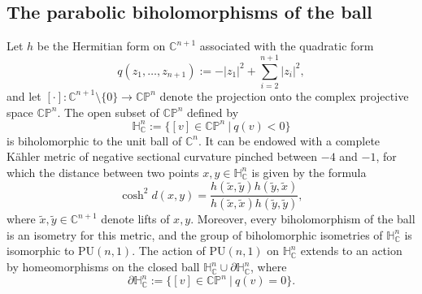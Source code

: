 \documentclass{article}
\theoremstyle{definition}
\theoremstyle{remark}
\newcommand{\C}{\mathbb{C}}
\newcommand{\HNC}{\mathbb{H}^{n}_{\C}}
\newcommand{\PHNC}{\partial\mathbb{H}^{n}_{\C}}
\newcommand{\PU}{\mathrm{PU}}
\newcommand{\PNC}{\C \mathbb{P}^{n}}
\begin{document}
	\subsection{The parabolic biholomorphisms of the ball}\label{ss-section-preli-parab}
	
	Let $h$ be the Hermitian form on $\C^{n+1}$ associated with the quadratic form\begin{equation*}
		q(z_1,\dots,z_{n+1}):=-\lvert z_1\rvert^{2} + \sum_{i=2}^{n+1}\lvert z_i\rvert^{2},
	\end{equation*}
	and let $[\cdot]:\C^{n+1}\setminus\{0\} \to \PNC$ denote the projection onto the complex projective space $\PNC$. The open subset of $\PNC$ defined by\begin{equation*}
		\HNC := \{[v]\in \PNC \ \vert \ q(v)<0\}
	\end{equation*}
	is biholomorphic to the unit ball of $\C^{n}$. It can be endowed with a complete Kähler metric of negative sectional curvature pinched between $-4$ and $-1$, for which the distance between two points $x,y\in \HNC$ is given by the formula\begin{equation*}
		\cosh^{2}d(x,y) = \frac{h(\widetilde{x},\widetilde{y}) h(\widetilde{y},\widetilde{x})}{ h(\widetilde{x},\widetilde{x}) h(\widetilde{y},\widetilde{y})},
	\end{equation*}
	where $\widetilde{x},\widetilde{y}\in \C^{n+1}$ denote lifts of $x,y$. Moreover, every biholomorphism of the ball is an isometry for this metric, and the group of biholomorphic isometries of $\HNC$ is isomorphic to $\PU(n,1)$. The action of $\PU(n,1)$ on $\HNC$ extends to an action by homeomorphisms on the closed ball $\HNC\cup \PHNC$, where\begin{equation*}
		\PHNC := \{[v]\in \PNC \ \vert \ q(v)=0\}.
	\end{equation*}
	
\end{document}
